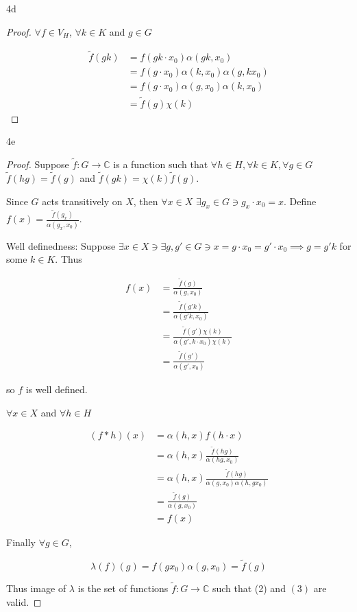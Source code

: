 \documentclass{article}
\newcommand{\C}{\mathbb{C}}
\begin{document}
\begin{PROB}{4d}\label{Problem 4d.}
\end{PROB}
\begin{proof}
    $\forall f \in V_H$, $\forall k \in K$ and $g \in G$
    
    \begin{align*}
        \tilde{f}(gk) &= f(gk \cdot x_0)\alpha(gk, x_0) \\
        &= f(g \cdot x_0) \alpha(k, x_0) \alpha(g, k x_0) \\
        &= f(g \cdot x_0) \alpha(g, x_0) \alpha(k, x_0) \\
        &= \tilde{f}(g) \chi(k)
    \end{align*}
\end{proof}

\begin{PROB}{4e}\label{Problem 4e.}
\end{PROB}
\begin{proof}
    Suppose $\tilde{f}: G \to \C$ is a function such that $\forall h \in H, \forall k \in K, \forall g \in G$ $\tilde{f}(hg) = \tilde{f}(g)$ and $\tilde{f}(gk) = \chi(k) \tilde{f}(g)$. 
    
    Since $G$ acts transitively on $X$, then $\forall x \in X$ $\exists g_x \in G \ni g_x \cdot x_0 = x$. Define $f(x) = \frac{\tilde{f}(g_x)}{\alpha(g_x, x_0)}$. 
    
    Well definedness: Suppose $\exists x \in X \ni \exists g, g' \in G \ni x = g \cdot x_0 = g' \cdot x_0 \implies g = g' k$ for some $k \in K$. Thus 
    
    \begin{align*}
        f(x) &= \frac{\tilde{f}(g)}{\alpha(g, x_0)} \\
        &= \frac{\tilde{f}(g'k)}{\alpha(g'k, x_0)} \\
        &= \frac{\tilde{f}(g')\chi(k)}{\alpha(g', k \cdot x_0) \chi(k)} \\
        &= \frac{\tilde{f}(g')}{\alpha(g', x_0)}
    \end{align*}

    so $f$ is well defined. 
    
    $\forall x \in X$ and $\forall h \in H$
    
    \begin{align*}
        (f \ast h)(x) &= \alpha(h, x) f(h \cdot x) \\
        &= \alpha(h, x) \frac{\tilde{f}(h g)}{\alpha(hg, x_0)} \\
        &= \alpha(h, x) \frac{\tilde{f}(h g)}{\alpha(g, x_0)\alpha(h, gx_0)} \\
        &=\frac{\tilde{f}(g)}{\alpha(g, x_0)} \\ 
        &= f(x)
    \end{align*}

    Finally $\forall g \in G$, 
    
    \[\lambda(f)(g) = f(gx_0)\alpha(g, x_0) = \tilde{f}(g)\] 

    Thus image of $\lambda$ is the set of functions $\tilde{f}: G \to \C$ such that (2) and $(3)$ are valid.  
\end{proof}
\end{document}
